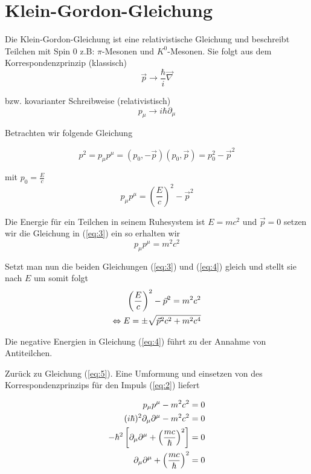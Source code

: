 
 



\section*{Klein-Gordon-Gleichung}


Die Klein-Gordon-Gleichung ist eine relativistische Gleichung und beschreibt Teilchen mit Spin 0 z.B: \(\pi\)-Mesonen und \(K^0\)-Mesonen. Sie folgt aus dem Korrespondenzprinzip (klassisch)
\begin{equation}
  \label{eq:1}
  \vec p \rightarrow \frac{\hbar}{i}\vec\nabla 
\end{equation}

bzw. kovarianter Schreibweise (relativistisch)
\begin{equation}
  \label{eq:2}
  p_\mu \rightarrow i\hbar \partial_\mu
\end{equation}

Betrachten wir folgende Gleichung

\[p^2 = p_\mu p^\mu = (p_0,-\vec p) (p_0,\vec p) =  p_0^2 -\vec p^2\]

mit \(p_0 = \frac{E}{c}\) 
\begin{equation}
  \label{eq:3}
  p_\mu p^\mu =  \left( \frac{E}{c}\right)^2 -\vec p^2
\end{equation}


Die Energie für ein Teilchen in seinem Ruhesystem ist \(E=mc^2\) und \(\vec p = 0\) setzen wir die Gleichung in (\ref{eq:3}) ein so erhalten wir
\begin{equation}
  \label{eq:5}
   p_\mu p^\mu = m^2c^2
\end{equation}

Setzt man nun die beiden Gleichungen (\ref{eq:3}) und (\ref{eq:4}) gleich und stellt sie nach \(E\) um somit folgt
\begin{align}
  \label{eq:4}
  \left( \frac{E}{c}\right)^2 -\vec p^2  = m^2c^2 \notag \\
\Leftrightarrow E = \pm \sqrt{\vec p^2c^2 + m^2c^4}
\end{align}

Die negative Energien in Gleichung (\ref{eq:4}) führt zu der Annahme von Antiteilchen.

Zurück zu Gleichung (\ref{eq:5}). Eine Umformung und einsetzen von des Korrespondenzprinzips für den Impuls (\ref{eq:2}) liefert

\begin{align}
  \label{eq:6}
   p_\mu p^\mu - m^2c^2 &= 0 \notag \\
(i\hbar)^2\partial_\mu\partial^\mu -  m^2c^2 &= 0  \notag \\
-\hbar^2\left[\partial_\mu\partial^\mu + \left(\frac{mc}{\hbar}\right)^2  \right] &= 0 \notag \\
\partial_\mu\partial^\mu + \left(\frac{mc}{\hbar}\right)^2  &= 0
\end{align}

